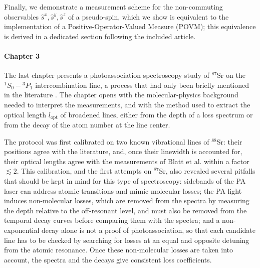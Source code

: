 Finally, we demonstrate a measurement scheme for the non-commuting observables $\hat{s}^x, \hat{s}^y, 
\hat{s}^z$ of a pseudo-spin, which we show is equivalent to the implementation of a Positive-Operator-Valued Measure (POVM); 
this equivalence is derived in a dedicated section following the included article.

\paragraph{Chapter 3}
The last chapter presents a photoassociation spectroscopy study of $^{87}$Sr on the
$^1S_0-{}^3P_1$ intercombination line, a process that had only been briefly mentioned in the
literature \cite{hill_photoassociative_2021}. The chapter opens with the molecular-physics background
needed to interpret the measurements, and with the method used to extract the optical length
$l_{\text{opt}}$ of broadened lines, either from the depth of a loss spectrum or from the decay
of the atom number at the line center.

The protocol was first calibrated on two known vibrational lines of $^{88}$Sr: their positions
agree with the literature, and, once their linewidth is accounted for, their optical lengths
agree with the measurements of Blatt et al. within a factor $\lesssim2$. This calibration, and
the first attempts on $^{87}$Sr, also revealed several pitfalls that should be kept in mind for
this type of spectroscopy: sidebands of the PA laser can address atomic transitions and mimic
molecular losses; the PA light induces non-molecular losses, which are removed from the
spectra by measuring the depth relative to the off-resonant level, and must also be removed from
the temporal decay curves before comparing them with the spectra; and a non-exponential
decay alone is not a proof of photoassociation, so that each candidate line has to be checked by
searching for losses at an equal and opposite detuning from the atomic resonance. Once these
non-molecular losses are taken into account, the spectra and the decays give consistent
loss coefficients.

